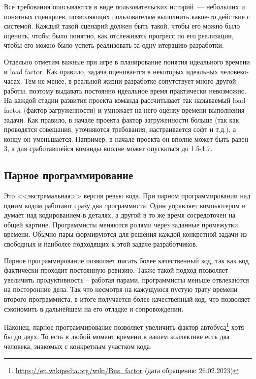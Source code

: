 \documentclass{../../text-style}
\begin{document}
Все требования описываются в виде пользовательских историй~--- небольших и понятных сценариев, позволяющих пользователям выполнить какое-то действие с системой. Каждый такой сценарий должен быть такой, чтобы его можно было оценить, чтобы было понятно, как отслеживать прогресс по его реализации, чтобы его можно было успеть реализовать за одну итерацию разработки.

Отдельно отметим важные при игре в планирование понятия идеального времени и load factor. Как правило, задача оценивается в некоторых идеальных человеко-часах. Тем не менее, в реальной жизни разработке сопутствует много другой работы, поэтому выдавать постоянно идеальное время практически невозможно. На каждой стадии развития проекта команда рассчитывает так называемый load factor (фактор загруженности) и умножает на него оценку времени выполнения задачи. Как правило, в начале проекта фактор загруженности больше (так как проводятся совещания, уточняются требования, настраивается софт и т.д.), а концу он уменьшается. Например, в начале проекта он вполне может быть равен 3, а для сработавшейся команды вполне может опускаться до 1.5-1.7.

\subsection{Парное программирование}

Это <<экстремальная>> версия ревью кода. При парном программировании над одним кодом работают сразу два программиста. Один управляет компьютером и думает над кодированием в деталях, а другой в то же время сосредоточен на общей картине. Программисты меняются ролями через заданные промежутки времени. Обычно пары формируются для решения каждой конкретной задачи из свободных и наиболее подходящих к этой задаче разработчиков.

Парное программирование позволяет писать более качественный код, так как код фактически проходит постоянную ревизию. Также такой подход позволяет увеличить продуктивность -- работая парами, программисты меньше отвлекаются на посторонние дела. Так что несмотря на кажущуюся пустую трату времени второго программиста, в итоге получается более качественный код, что позволяет сэкономить в дальнейшем на его отладке и сопровождении.

Наконец, парное программирование позволяет увеличить фактор автобуса\footnote{\url{https://en.wikipedia.org/wiki/Bus_factor} (дата обращения: 26.02.2023)} хотя бы до двух. То есть в любой момент времени в вашем коллективе есть два человека, знакомых с конкретным участком кода.
\end{document}
